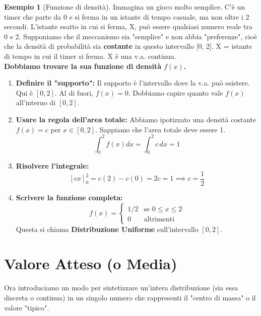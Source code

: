 \documentclass[a4paper, 11pt]{article}
\theoremstyle{definition}
\newtheorem{esempio}{Esempio}[section]
\begin{document}
\begin{esempio}[Funzione di densità]
Immagina un gioco molto semplice. C'è un timer che parte da 0 e si ferma in un istante di tempo casuale, ma non oltre i 2 secondi. L'istante esatto in cui si ferma, X, può essere qualsiasi numero reale tra 0 e 2. Supponiamo che il meccanismo sia "semplice" e non abbia "preferenze", cioè che la densità di probabilità sia \textbf{costante} in questo intervallo [0, 2].
X = istante di tempo in cui il timer si ferma. X è una v.a. continua. \\
\textbf{Dobbiamo trovare la sua funzione di densità $f(x)$.}

\begin{tcolorbox}[colback=gray!10, colframe=black, title=Passaggi per la soluzione]
\begin{enumerate}
    \item \textbf{Definire il "supporto":} Il supporto è l'intervallo dove la v.a. può esistere. Qui è $[0, 2]$. Al di fuori, $f(x)=0$. Dobbiamo capire quanto vale $f(x)$ all'interno di $[0, 2]$.

    \item \textbf{Usare la regola dell'area totale:} Abbiamo ipotizzato una densità costante $f(x)=c$ per $x \in [0, 2]$. Sappiamo che l'area totale deve essere 1.
    \[ \int_{0}^{2} f(x)dx = \int_{0}^{2} c \, dx = 1 \]

    \item \textbf{Risolvere l'integrale:}
    \[ [cx]_0^2 = c(2) - c(0) = 2c = 1 \implies c = \frac{1}{2} \]

    \item \textbf{Scrivere la funzione completa:}
    \[ f(x) =
    \begin{cases}
    1/2 & \text{se } 0 \le x \le 2 \\
    0 & \text{altrimenti}
    \end{cases}
    \]
    Questa si chiama \textbf{Distribuzione Uniforme} sull'intervallo $[0, 2]$.
\end{enumerate}
\end{tcolorbox}
\end{esempio}

\section{Valore Atteso (o Media)}
Ora introduciamo un modo per sintetizzare un'intera distribuzione (sia essa discreta o continua) in un singolo numero che rappresenti il "centro di massa" o il valore "tipico".
\end{document}
